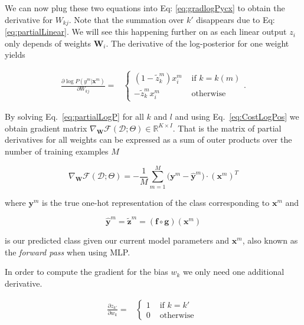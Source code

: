 We can now plug these two equations into Eq: \ref{eq:gradlogPycx} to obtain the derivative for $W_{kj}$. Note that the summation over $k'$ disappears due to Eq:\ref{eq:partialLinear}. We will see this happening further on as each linear output $z_i$ only depends of weights $\mathbf{W}_i$. The derivative of the log-posterior for one weight yields 

\begin{align}
\frac{\partial \log P(y^m | \mathbf{x}^m) }{\partial W_{kj}} = 
  &\begin{cases}
     (1 - \tilde{z}_k^m) x_i^m  &  \mbox{ if } k = k(m)\\ 
       -\tilde{z}_k^m x_i^m             &  \mbox{ otherwise } 
  \end{cases}. 
  \label{eq:partialLogP} 
\end{align}

By solving Eq.~\ref{eq:partialLogP} for all $k$ and $l$ and using Eq.~\ref{eq:CostLogPos} we obtain gradient matrix $\nabla_\mathbf{W}\mathcal{F}(\mathcal{D};\Theta) \in \mathbb{R}^{K \times I}$. That is the matrix of partial derivatives for all weights can be expressed as a sum of outer products over the number of training examples $M$  

\begin{equation}
\nabla_\mathbf{W}\mathcal{F}(\mathcal{D};\Theta) = -\frac{1}{M}\sum_{m=1}^M \Big(\mathbf{y}^m - \hat{\mathbf{y}}^m \Big) \cdot \left(\mathbf{x}^m\right)^T  
\label{gradWeigths}
\end{equation}

\noindent where $\mathbf{y}^m$ is the true one-hot representation of the class corresponding to $\mathbf{x}^m$ and 

\begin{equation}
\hat{\mathbf{y}}^m = \tilde{\mathbf{z}}^m =  (\mathbf{f} \circ \mathbf{g})(\mathbf{x}^m)
\label{eq:forwardPass}
\end{equation}

is our predicted class given our current model parameters and $\mathbf{x}^m$, also known as the \textit{forward pass} when using MLP.

\noindent In order to compute the gradient for the bias $w_{k}$  we only need one additional derivative.

\begin{align}
\frac{\partial z_{k'}}{\partial w_{k}} = 
  &\begin{cases}
      1  &  \mbox{ if } k = k'\\ 
      0  &  \mbox{ otherwise } 
  \end{cases} 
  \label{eqn:eqsilonq}
\end{align}
	
